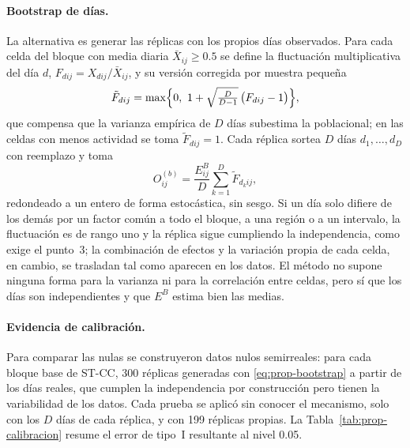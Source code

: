 \paragraph{Bootstrap de días.} La alternativa es generar las réplicas con los
propios días observados. Para cada celda del bloque con media diaria
$\bar X_{ij}\ge 0.5$ se define la fluctuación multiplicativa del día $d$,
$F_{dij} = X_{dij}/\bar X_{ij}$, y su versión corregida por muestra pequeña
\begin{equation}\label{eq:prop-fluctuacion}
  \tilde F_{dij} = \max\Bigl\{0,\ 1 + \sqrt{\tfrac{D}{D-1}}\,\bigl(F_{dij}-1\bigr)\Bigr\},
\end{equation}
que compensa que la varianza empírica de $D$ días subestima la poblacional; en
las celdas con menos actividad se toma $\tilde F_{dij}=1$. Cada réplica sortea
$D$ días $d_1,\dots,d_D$ con reemplazo y toma
\begin{equation}\label{eq:prop-bootstrap}
  O^{(b)}_{ij} = \frac{E^B_{ij}}{D}\sum_{k=1}^{D} \tilde F_{d_k ij},
\end{equation}
redondeado a un entero de forma estocástica, sin sesgo. Si un día solo difiere
de los demás por un factor común a todo el bloque, a una región o a un
intervalo, la fluctuación es de rango uno y la réplica sigue cumpliendo la
independencia, como exige el punto~3; la combinación de efectos y la variación
propia de cada celda, en cambio, se trasladan tal como aparecen en los datos.
El método no supone ninguna forma para la varianza ni para la correlación entre
celdas, pero sí que los días son independientes y que $E^B$ estima bien las
medias.

\paragraph{Evidencia de calibración.} Para comparar las nulas se construyeron
datos nulos semirreales: para cada bloque base de ST-CC, 300 réplicas generadas
con \eqref{eq:prop-bootstrap} a partir de los días reales, que cumplen la
independencia por construcción pero tienen la variabilidad de los datos. Cada
prueba se aplicó sin conocer el mecanismo, solo con los $D$ días de cada
réplica, y con 199 réplicas propias. La Tabla~\ref{tab:prop-calibracion}
resume el error de tipo~I resultante al nivel 0.05.


